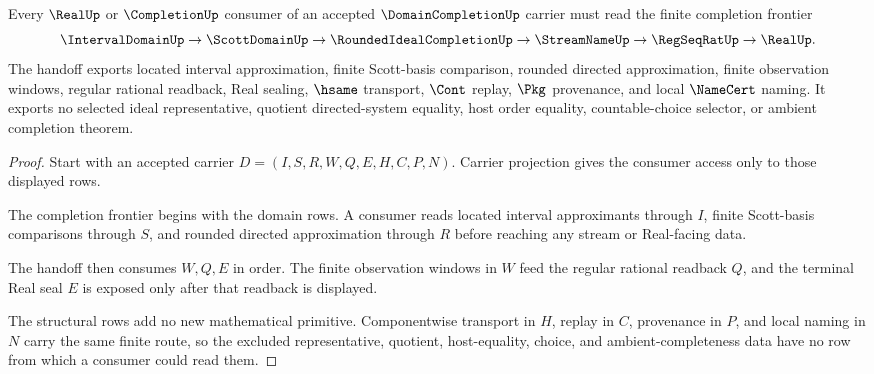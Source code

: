 \begin{theorem}
\label{thm:domain-completion-real-handoff}
Every $\RealUp$ or $\CompletionUp$ consumer of an accepted $\DomainCompletionUp$ carrier must read the finite completion frontier
$$
\IntervalDomainUp \to \ScottDomainUp \to \RoundedIdealCompletionUp \to \StreamNameUp \to \RegSeqRatUp \to \RealUp .
$$
The handoff exports located interval approximation, finite Scott-basis comparison, rounded directed approximation, finite observation windows, regular rational readback, Real sealing, $\hsame$ transport, $\Cont$ replay, $\Pkg$ provenance, and local $\NameCert$ naming. It exports no selected ideal representative, quotient directed-system equality, host order equality, countable-choice selector, or ambient completion theorem.
\end{theorem}
\begin{proof}
Start with an accepted carrier $D=(I,S,R,W,Q,E,H,C,P,N)$. Carrier projection gives the consumer access only to those displayed rows.

The completion frontier begins with the domain rows. A consumer reads located interval approximants through $I$, finite Scott-basis comparisons through $S$, and rounded directed approximation through $R$ before reaching any stream or Real-facing data.

The handoff then consumes $W,Q,E$ in order. The finite observation windows in $W$ feed the regular rational readback $Q$, and the terminal Real seal $E$ is exposed only after that readback is displayed.

The structural rows add no new mathematical primitive. Componentwise transport in $H$, replay in $C$, provenance in $P$, and local naming in $N$ carry the same finite route, so the excluded representative, quotient, host-equality, choice, and ambient-completeness data have no row from which a consumer could read them.
\end{proof}



